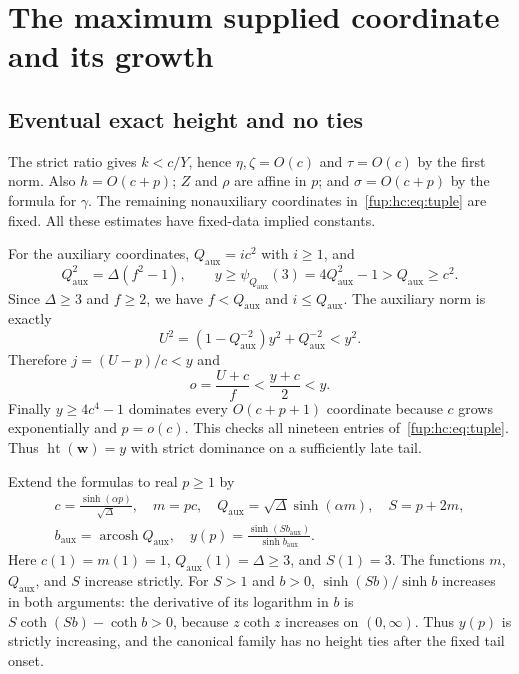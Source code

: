 \documentclass[11pt,letterpaper]{article}
\theoremstyle{definition}\newtheorem{definition}[theorem]{Definition}
\theoremstyle{remark}\newtheorem{remark}[theorem]{Remark}
\DeclareMathOperator{\arcosh}{arcosh}
\newcommand{\qaux}{Q_{\mathrm{aux}}}
\newcommand{\htop}{\operatorname{ht}}
\begin{document}
\section{The maximum supplied coordinate and its growth}\label{fup:hc:sec:height}
\subsection{Eventual exact height and no ties}
The strict ratio gives $k<c/Y$, hence $\eta,\zeta=O(c)$ and $\tau=O(c)$ by the first norm. Also $h=O(c+p)$; $Z$ and $\rho$ are affine in $p$; and $\sigma=O(c+p)$ by the formula for $\gamma$. The remaining nonauxiliary coordinates in~\eqref{fup:hc:eq:tuple} are fixed. All these estimates have fixed-data implied constants.

For the auxiliary coordinates, $\qaux=ic^2$ with $i\ge1$, and
\[
 \qaux^2=\Delta(f^2-1),\qquad
 y\ge\psi_{\qaux}(3)=4\qaux^2-1>\qaux\ge c^2.
\]
Since $\Delta\ge3$ and $f\ge2$, we have $f<\qaux$ and $i\le\qaux$. The auxiliary norm is exactly
\begin{equation}\label{fup:hc:eq:unorm}
 U^2=(1-\qaux^{-2})y^2+\qaux^{-2}<y^2.
\end{equation}
Therefore $j=(U-p)/c<y$ and
\[
 o=\frac{U+c}{f}<\frac{y+c}{2}<y.
\]
Finally $y\ge4c^4-1$ dominates every $O(c+p+1)$ coordinate because $c$ grows exponentially and $p=o(c)$. This checks all nineteen entries of~\eqref{fup:hc:eq:tuple}. Thus $\htop(\mathbf w)=y$ with strict dominance on a sufficiently late tail.

Extend the formulas to real $p\ge1$ by
\begin{equation}\label{fup:hc:eq:realextension}
 \begin{gathered}
 c=\frac{\sinh(\alpha p)}{\sqrt\Delta},\quad m=pc,\quad
 \qaux=\sqrt\Delta\sinh(\alpha m),\quad S=p+2m,\\
 b_{\mathrm{aux}}=\arcosh\qaux,\quad
 y(p)=\frac{\sinh(Sb_{\mathrm{aux}})}{\sinh b_{\mathrm{aux}}}.
 \end{gathered}
\end{equation}
Here $c(1)=m(1)=1$, $\qaux(1)=\Delta\ge3$, and $S(1)=3$. The functions $m$, $\qaux$, and $S$ increase strictly. For $S>1$ and $b>0$, $\sinh(Sb)/\sinh b$ increases in both arguments: the derivative of its logarithm in $b$ is $S\coth(Sb)-\coth b>0$, because $z\coth z$ increases on $(0,\infty)$. Thus $y(p)$ is strictly increasing, and the canonical family has no height ties after the fixed tail onset.
\end{document}
